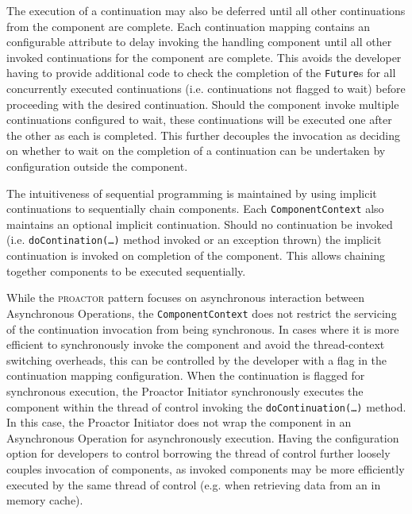\documentclass[prodmode]{style/acmlarge}
\begin{document}
The execution of a continuation may also be deferred until all other
continuations from the component are complete.  Each continuation mapping
contains an configurable attribute to delay invoking the handling component
until all other invoked continuations for the component are complete.  This
avoids the developer having to provide additional code to check the completion
of the \texttt{Future}s for all concurrently executed continuations (i.e.
continuations not flagged to wait) before proceeding with the desired
continuation.  Should the component invoke multiple continuations configured to
wait, these continuations will be executed one after the other as each is
completed.  This further decouples the invocation as deciding on whether to wait
on the completion of a continuation can be undertaken by configuration outside
the component.

The intuitiveness of sequential programming is maintained by using implicit
continuations \cite{continuations} to sequentially chain components.  Each
\texttt{ComponentContext} also maintains an optional implicit continuation. 
Should no continuation be invoked (i.e. \texttt{doContination(\ldots)} method
invoked or an exception thrown) the implicit continuation is invoked on
completion of the component.  This allows chaining together components to be
executed sequentially.

While the \textsc{proactor} pattern focuses on asynchronous interaction between
Asynchronous Operations, the \texttt{ComponentContext} does not restrict the
servicing of the continuation invocation from being synchronous.  In cases where
it is more efficient to synchronously invoke the component and avoid the
thread-context switching overheads, this can be controlled by the developer with
a flag in the continuation mapping configuration.  When the continuation is
flagged for synchronous execution, the Proactor Initiator synchronously executes
the component within the thread of control invoking the
\texttt{doContinuation(\ldots)} method.  In this case, the Proactor Initiator
does not wrap the component in an Asynchronous Operation for asynchronously
execution.  Having the configuration option for developers to control borrowing the
thread of control further loosely couples invocation of components, as invoked
components may be more efficiently executed by the same thread of control (e.g.
when retrieving data from an in memory cache).
\end{document}
